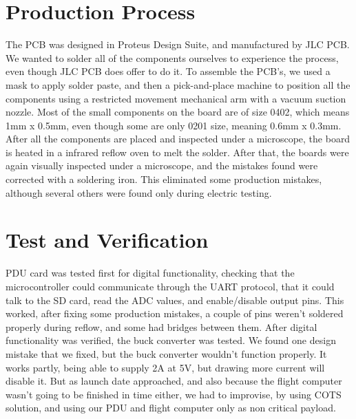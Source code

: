 \documentclass{article}
\begin{document}
\section{Production Process}
The PCB was designed in Proteus Design Suite, and manufactured by JLC PCB. We wanted to solder all of the components ourselves to experience the process, even though JLC PCB does offer to do it. To assemble the PCB's, we used a mask to apply solder paste, and then a pick-and-place machine to position all the components using a restricted movement mechanical arm with a vacuum suction nozzle. Most of the small components on the board are of size 0402, which means 1mm x 0.5mm, even though some are only 0201 size, meaning 0.6mm x 0.3mm. After all the components are placed and inspected under a microscope, the board is heated in a infrared reflow oven to melt the solder. After that, the boards were again visually inspected under a microscope, and the mistakes found were corrected with a soldering iron. This eliminated some production mistakes, although several others were found only during electric testing. 


\section{Test and Verification}
PDU card was tested first for digital functionality, checking that the microcontroller could communicate through the UART protocol, that it could talk to the SD card, read the ADC values, and enable/disable output pins. This worked, after fixing some production mistakes, a couple of pins weren't soldered properly during reflow, and some had bridges between them. After digital functionality was verified, the buck converter was tested. We found one design mistake that we fixed, but the buck converter wouldn't function properly. It works partly, being able to supply 2A at 5V, but drawing more current will disable it. But as launch date approached, and also because the flight computer wasn't going to be finished in time either, we had to improvise, by using COTS solution, and using our PDU and flight computer only as non critical payload. 
\end{document}
